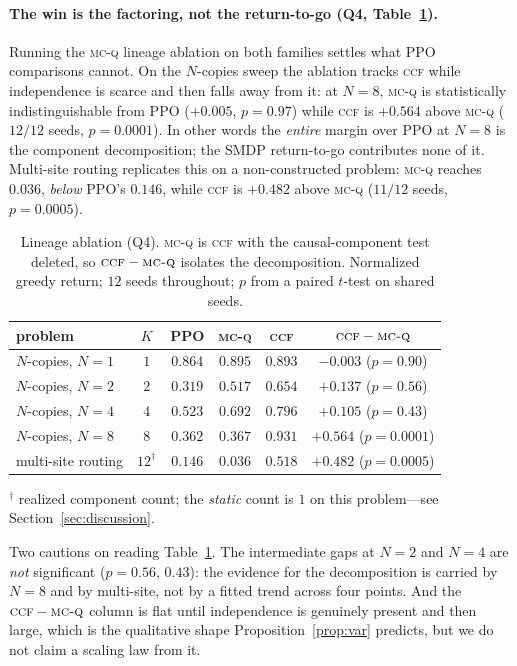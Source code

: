 \documentclass[review,authoryear,3p,times]{elsarticle}
\newcommand{\ccf}{\textsc{ccf}}
\newcommand{\mcq}{\textsc{mc-q}}
\begin{document}
\paragraph{The win is the factoring, not the return-to-go (Q4,
Table~\ref{tab:ablation}).} Running the \mcq{} lineage ablation on both
families settles what PPO comparisons cannot. On the $N$-copies sweep the
ablation tracks \ccf{} while independence is scarce and then falls away from it:
at $N{=}8$, \mcq{} is statistically indistinguishable from PPO
($+0.005$, $p=0.97$) while \ccf{} is $+0.564$ above \mcq{} ($12/12$ seeds,
$p=0.0001$). In other words the \emph{entire} margin over PPO at $N{=}8$ is the
component decomposition; the SMDP return-to-go contributes none of it. Multi-site
routing replicates this on a non-constructed problem: \mcq{} reaches $0.036$,
\emph{below} PPO's $0.146$, while \ccf{} is $+0.482$ above \mcq{}
($11/12$ seeds, $p=0.0005$).

\begin{table}[t]
\centering
\caption{Lineage ablation (Q4). \mcq{} is \ccf{} with the causal-component test
deleted, so $\ccf-\mcq$ isolates the decomposition. Normalized greedy return;
$12$ seeds throughout; $p$ from a paired $t$-test on shared seeds.}
\label{tab:ablation}
\begin{tabular}{lccccc}
\toprule
problem & $K$ & PPO & \mcq{} & \ccf{} & $\ccf-\mcq$ \\
\midrule
$N$-copies, $N{=}1$ & $1$ & $0.864$ & $0.895$ & $0.893$ & $-0.003$ \hfill ($p{=}0.90$) \\
$N$-copies, $N{=}2$ & $2$ & $0.319$ & $0.517$ & $0.654$ & $+0.137$ \hfill ($p{=}0.56$) \\
$N$-copies, $N{=}4$ & $4$ & $0.523$ & $0.692$ & $0.796$ & $+0.105$ \hfill ($p{=}0.43$) \\
$N$-copies, $N{=}8$ & $8$ & $0.362$ & $0.367$ & $\mathbf{0.931}$ & $\mathbf{+0.564}$ \hfill ($p{=}0.0001$) \\
multi-site routing  & $12^{\dagger}$ & $0.146$ & $0.036$ & $\mathbf{0.518}$ & $\mathbf{+0.482}$ \hfill ($p{=}0.0005$) \\
\bottomrule
\end{tabular}

\smallskip
\footnotesize $^{\dagger}$ realized component count; the \emph{static} count is
$1$ on this problem---see Section~\ref{sec:discussion}.
\end{table}

Two cautions on reading Table~\ref{tab:ablation}. The intermediate gaps at
$N{=}2$ and $N{=}4$ are \emph{not} significant ($p=0.56$, $0.43$): the evidence
for the decomposition is carried by $N{=}8$ and by multi-site, not by a fitted
trend across four points. And the $\ccf-\mcq$ column is flat until independence
is genuinely present and then large, which is the qualitative shape
Proposition~\ref{prop:var} predicts, but we do not claim a scaling law from it.
\end{document}
